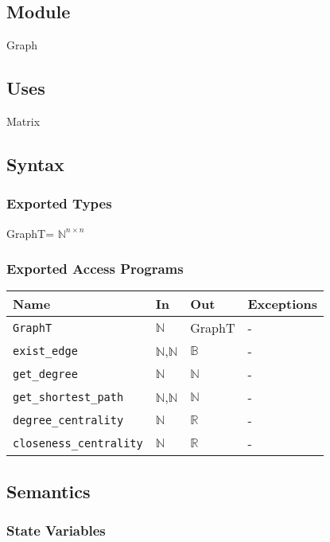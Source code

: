 \documentclass[12pt, titlepage]{article}
\begin{document}
\subsection{Module}
Graph

\subsection{Uses}
Matrix
\subsection{Syntax}

\subsubsection{Exported Types}
GraphT= ${\mathbb{N}}^ {n\times n}$
\subsubsection{Exported Access Programs}
\begin{center}
\begin{tabular}{p{6cm} p{4cm} p{4cm} p{2cm}}
\hline
\textbf{Name} & \textbf{In} & \textbf{Out} & \textbf{Exceptions} \\
\hline
\texttt{GraphT} & ${\mathbb{N}}$  & GraphT& - \\
\texttt{exist\_edge} & $\mathbb{N}$,$\mathbb{N}$ & $\mathbb{B}$  & - \\
\texttt{get\_degree} & $\mathbb{N}$ & $\mathbb{N}$ & - \\
\texttt{get\_shortest\_path} & $\mathbb{N}$,$\mathbb{N}$ & $\mathbb{N}$ & - \\
\texttt{degree\_centrality} & $\mathbb{N}$ & $\mathbb{R}$ & - \\
\texttt{closeness\_centrality} & $\mathbb{N}$ & $\mathbb{R}$ & - \\

\hline
\end{tabular}
\end{center}

\subsection{Semantics}

\subsubsection{State Variables}
\end{document}
